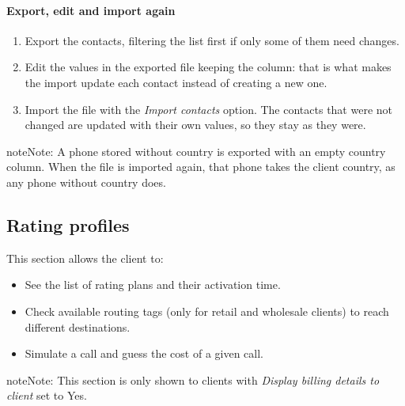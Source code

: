 \documentclass[letterpaper,10pt,english]{sphinxmanual}
\begin{document}
\paragraph{Export, edit and import again}
\begin{enumerate}
\item {} 
Export the contacts, filtering the list first if only some of them need changes.

\item {} 
Edit the values in the exported file keeping the  column: that is what makes the import update each
contact instead of creating a new one.

\item {} 
Import the file with the \emph{Import contacts} option. The contacts that were not changed are updated with
their own values, so they stay as they were.

\end{enumerate}

\begin{notice}{note}{Note:}
A phone stored without country is exported with an empty country column. When the file is imported
again, that phone takes the client country, as any phone without country does.
\end{notice}


\subsection{Rating profiles}
\label{administration_portal/client/vpbx/rating_profiles:rating-profiles}\label{administration_portal/client/vpbx/rating_profiles::doc}
This section allows the client to:
\begin{itemize}
\item {} 
See the list of rating plans and their activation time.

\item {} 
Check available routing tags (only for retail and wholesale clients) to reach different destinations.

\item {} 
Simulate a call and guess the cost of a given call.

\end{itemize}

\begin{notice}{note}{Note:}
This section is only shown to clients with \emph{Display billing details to client} set to Yes.
\end{notice}
\end{document}
